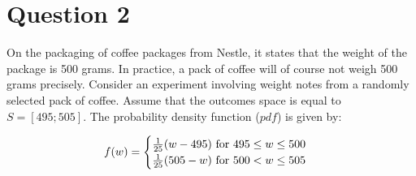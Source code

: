 \documentclass[12pt]{article}%
\begin{document}
\pagebreak
\section{Question 2}
\onehalfspacing

On the packaging of coffee packages from Nestle, it states that the weight of the package is 500 grams. In practice, a pack of coffee will of course not weigh 500 grams precisely. Consider an experiment involving weight notes from a randomly selected pack of coffee. Assume that the outcomes space is equal to $S = [495; 505]$. The probability density function ($pdf$) is given by:

\begin{equation*}
  f(w) =
    \begin{cases}
      \frac{1}{25} (w-495) $ for $ 495 \leq w \leq 500\\
      \frac{1}{25} (505-w) $ for $ 500 < w \leq 505
    \end{cases}       
\end{equation*}
\linebreak
\end{document}
